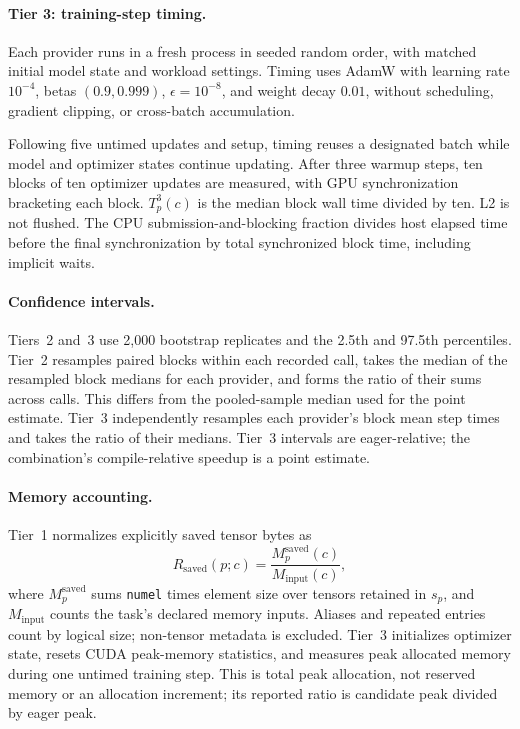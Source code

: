 \paragraph{Tier 3: training-step timing.}
Each provider runs in a fresh process in seeded random order, with matched initial model state and workload settings. Timing uses AdamW with learning rate $10^{-4}$, betas $(0.9,0.999)$, $\epsilon=10^{-8}$, and weight decay $0.01$, without scheduling, gradient clipping, or cross-batch accumulation.

Following five untimed updates and setup, timing reuses a designated batch while model and optimizer states continue updating. After three warmup steps, ten blocks of ten optimizer updates are measured, with GPU synchronization bracketing each block. $T^3_p(c)$ is the median block wall time divided by ten. L2 is not flushed. The CPU submission-and-blocking fraction divides host elapsed time before the final synchronization by total synchronized block time, including implicit waits.

\paragraph{Confidence intervals.}
Tiers~2 and~3 use 2,000 bootstrap replicates and the 2.5th and 97.5th percentiles. Tier~2 resamples paired blocks within each recorded call, takes the median of the resampled block medians for each provider, and forms the ratio of their sums across calls. This differs from the pooled-sample median used for the point estimate. Tier~3 independently resamples each provider's block mean step times and takes the ratio of their medians. Tier~3 intervals are eager-relative; the combination's compile-relative speedup is a point estimate.

\paragraph{Memory accounting.}
Tier~1 normalizes explicitly saved tensor bytes as
\begin{equation}
R_{\mathrm{saved}}(p;c)=\frac{M_p^{\mathrm{saved}}(c)}{M_{\mathrm{input}}(c)},
\label{eq:saved_memory_ratio}
\end{equation}
where $M_p^{\mathrm{saved}}$ sums \texttt{numel} times element size over tensors retained in $s_p$, and $M_{\mathrm{input}}$ counts the task's declared memory inputs. Aliases and repeated entries count by logical size; non-tensor metadata is excluded. Tier~3 initializes optimizer state, resets CUDA peak-memory statistics, and measures peak allocated memory during one untimed training step. This is total peak allocation, not reserved memory or an allocation increment; its reported ratio is candidate peak divided by eager peak.


